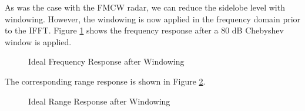 \documentclass[conference]{IEEEtran}
\begin{document}
  	  	As was the case with the FMCW radar, we can reduce the sidelobe level with windowing. However, the windowing is now applied in the frequency domain prior to the IFFT. Figure \ref{fig::ofdm_radar_freq_resp_with_window} shows the frequency response after a 80 dB Chebyshev window is applied.
  	  	
  	  	\begin{figure}[H]
			\centering
    			\caption{Ideal Frequency Response after Windowing}
    			\label{fig::ofdm_radar_freq_resp_with_window}
  	  	\end{figure}
  	  	 
  	  	The corresponding range response is shown in Figure \ref{fig::ofdm_radar_range_resp_with_window}.
  	  	
  	  	\begin{figure}[H]
  	  		\centering
    			\caption{Ideal Range Response after Windowing}
    			\label{fig::ofdm_radar_range_resp_with_window}
  	  	\end{figure}
  	  	
\end{document}
